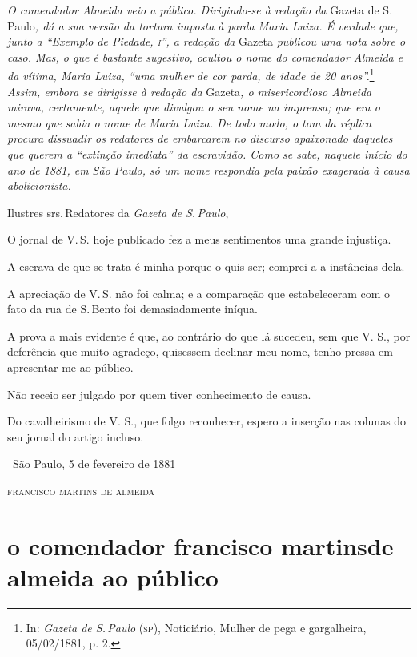 {\begin{resumo}
\emph{O comendador Almeida veio a público. Dirigindo-se à redação da}
Gazeta de S.\,Paulo\emph{, dá a sua versão da tortura imposta à parda
Maria Luiza. É verdade que, junto a ``Exemplo de Piedade, \textsc{i}'', a
redação da} Gazeta \emph{publicou uma nota sobre o caso. Mas, o que é
bastante sugestivo, ocultou o nome do comendador Almeida e da vítima,
Maria Luiza, ``uma mulher de cor parda, de idade de 20 anos''.}\footnote{
  In: \emph{Gazeta de S.\,Paulo} (\textsc{sp}), Noticiário, Mulher de pega e
  gargalheira, 05/02/1881, p. 2.}
\emph{Assim, embora se
dirigisse à redação da} Gazeta\emph{, o misericordioso Almeida mirava,
certamente, aquele que divulgou o seu nome na imprensa; que era o mesmo
que sabia o nome de Maria Luiza. De todo modo, o tom da réplica procura
dissuadir os redatores de embarcarem no discurso apaixonado daqueles que
querem a ``extinção imediata'' da escravidão. Como se sabe, naquele início
do ano de 1881, em São Paulo, só um nome respondia pela paixão exagerada
à causa abolicionista. }
\end{resumo}

Ilustres srs.\,Redatores da \emph{Gazeta de S.\,Paulo},

O jornal de V.\,S. hoje publicado fez a meus sentimentos uma grande
injustiça.

A escrava de que se trata é minha porque o quis ser; comprei-a a
instâncias dela.

A apreciação de V.\,S. não foi calma; e a comparação que estabeleceram
com o fato da rua de S.\,Bento foi demasiadamente iníqua.

A prova a mais evidente é que, ao contrário do que lá sucedeu, sem que
V. S., por deferência que muito agradeço, quisessem declinar meu nome,
tenho pressa em apresentar-me ao público.

Não receio ser julgado por quem tiver conhecimento de causa.

Do cavalheirismo de V. S., que folgo reconhecer, espero a inserção nas
colunas do seu jornal do artigo incluso.

\medskip
\hfill\ São Paulo, 5 de fevereiro de 1881

\hfill\textsc{francisco martins de almeida}

\section*{o comendador francisco martins\break de almeida ao público}

}
